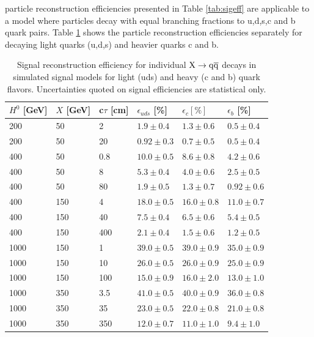 \X particle reconstruction efficiencies presented in Table \ref{tab:sigeff} 
are applicable to a model where \X particles decay with equal branching fractions to u,d,s,c and b quark pairs.
Table \ref{tab:sigeffflavor} shows the \X particle reconstruction efficiencies separately for 
\X decaying light quarks (u,d,s) and
heavier quarks c and b. 


\begin{table}[htbp]
\caption{Signal reconstruction efficiency for individual $\mathrm{X}\rightarrow\mathrm{q}\overline{\mathrm{q}}$ decays
 in simulated signal models for light (uds) and heavy (c and b) quark flavors.
 Uncertainties quoted on signal efficiencies are statistical only.\label{tab:sigeffflavor}} 
\centering 
\begin{tabular}{llllll} 
\hline
$H^{0}$ [GeV] & $X$ [GeV] & c$\tau$ [cm] & $\epsilon_{uds}$ [\%] & $\epsilon_{c} [\%] $ & $\epsilon_{b}$ [\%]\\
\hline
200 & 50 & 2 & $1.9\pm0.4$ & $1.3\pm0.6$ & $0.5\pm0.4$ \\
200 & 50 & 20 & $0.92\pm0.3$ & $0.7\pm0.5$ & $0.5\pm0.4$ \\
\hline
400 & 50 & 0.8 & $10.0\pm0.5$ & $8.6\pm0.8$ & $4.2\pm0.6$ \\
400 & 50 & 8 & $5.3\pm0.4$ & $4.0\pm0.6$ & $2.5\pm0.5$ \\
400 & 50 & 80 & $1.9\pm0.5$ & $1.3\pm0.7$ & $0.92\pm0.6$ \\
\hline
400 & 150 & 4 & $18.0\pm0.5$ & $16.0\pm0.8$ & $11.0\pm0.7$ \\
400 & 150 & 40 & $7.5\pm0.4$ & $6.5\pm0.6$ & $5.4\pm0.5$ \\
400 & 150 & 400 & $2.1\pm0.4$ & $1.5\pm0.6$ & $1.2\pm0.5$ \\
\hline
1000 & 150 & 1 & $39.0\pm0.5$ & $39.0\pm0.9$ & $35.0\pm0.9$ \\
1000 & 150 & 10 & $26.0\pm0.5$ & $26.0\pm0.9$ & $25.0\pm0.9$ \\
1000 & 150 & 100 & $15.0\pm0.9$ & $16.0\pm2.0$ & $13.0\pm1.0$ \\
\hline
1000 & 350 & 3.5 & $41.0\pm0.5$ & $40.0\pm0.9$ & $36.0\pm0.8$ \\
1000 & 350 & 35 & $23.0\pm0.5$ & $22.0\pm0.8$ & $21.0\pm0.8$ \\
1000 & 350 & 350 & $12.0\pm0.7$ & $11.0\pm1.0$ & $9.4\pm1.0$ \\
\hline
\end{tabular} 
\end{table}

